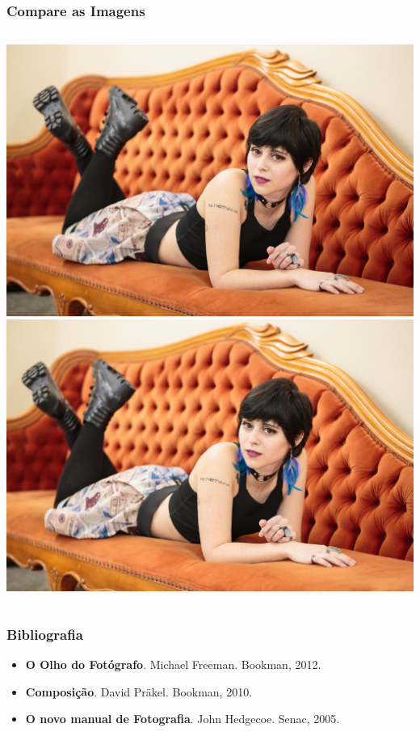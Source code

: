 \begin{frame}
    \frametitle{Compare as Imagens}
    \begin{columns}
      \column{0.45\paperwidth}
        \includegraphics[width=0.45\paperwidth]{images/equilibrio_1.jpg}
      \column{0.45\paperwidth}
        \includegraphics[width=0.45\paperwidth]{images/equilibrio_2.jpg}
    \end{columns}
\end{frame}




\begin{frame}
    \frametitle{Bibliografia}
    \begin{itemize}
      \item \textbf{O Olho do Fotógrafo}. Michael Freeman. Bookman, 2012.
      \item \textbf{Composição}. David Präkel. Bookman, 2010.
      \item \textbf{O novo manual de Fotografia}. John Hedgecoe. Senac, 2005.
    \end{itemize}
\end{frame}



